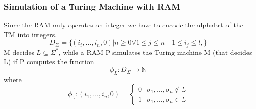 \subsubsection{Simulation of a Turing Machine with RAM}
Since the RAM only operates on integer we have to encode the alphabet of the TM into integers.
\[ 
    D_{\Sigma}= \{(i_i,\ldots, i_n,0) | n\geq 0 \forall 1\leq j\leq n \quad 1 \leq i_j\leq l,  \} 
\]
M decides $L \subseteq \Sigma^*$, while a RAM P simulates the Turing machine M (that decides L) if P computes the function  \[ 
    \phi_L : D_{\Sigma} \longrightarrow \mathbb{N}
\]where \[ 
    \phi_L : (i_{1}, \ldots,i_{n}, 0) = \begin{cases}
        0 & \sigma_{1}, \ldots,\sigma_{n} \notin L\\
        1 & \sigma_{1}, \ldots,\sigma_{n} \in L  
    \end{cases} 
\]
